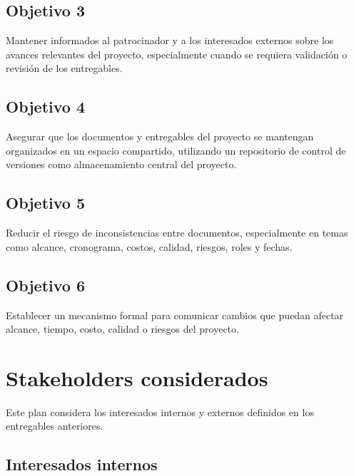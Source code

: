 \documentclass[11pt,spanish]{article}
\begin{document}
\subsection{Objetivo 3}

Mantener informados al patrocinador y a los interesados externos sobre los avances relevantes del proyecto, especialmente cuando se requiera validación o revisión de los entregables.

\subsection{Objetivo 4}

Asegurar que los documentos y entregables del proyecto se mantengan organizados en un espacio compartido, utilizando un repositorio de control de versiones como almacenamiento central del proyecto.

\subsection{Objetivo 5}

Reducir el riesgo de inconsistencias entre documentos, especialmente en temas como alcance, cronograma, costos, calidad, riesgos, roles y fechas.

\subsection{Objetivo 6}

Establecer un mecanismo formal para comunicar cambios que puedan afectar alcance, tiempo, costo, calidad o riesgos del proyecto.

\section{Stakeholders considerados}

Este plan considera los interesados internos y externos definidos en los entregables anteriores.

\subsection{Interesados internos}
\end{document}
